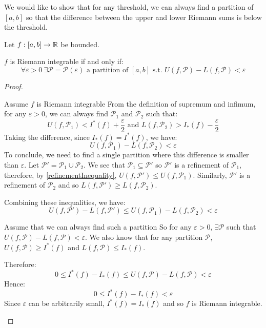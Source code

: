 \documentclass[../main.tex]{subfiles}
\begin{document}
We would like to show that for any threshold, we can always find a partition of $[a, b]$ so that the difference between the upper and lower Riemann sums is below the threshold.
\begin{proposition}
  Let $f: [a, b] \to \mathbb{R}$ be bounded.

  $f$ is Riemann integrable if and only if:
  \label{integrabilityCritereon}
  \[
    \forall \varepsilon > 0\ \exists \mathcal{P} = \mathcal{P}(\varepsilon) \text{ a partition of } [a, b] \text{ s.t. } U(f, \mathcal{P}) - L(f, \mathcal{P}) < \varepsilon
  \]
\end{proposition}
\begin{proof}
  \begin{proofdirection}{Assume $f$ is Riemann integrable}
    From the definition of supremum and infimum, for any $\varepsilon > 0$, we can always find $\mathcal{P}_1$ and $\mathcal{P}_2$ such that:
    \[
      U(f, \mathcal{P}_1) < I^{*}(f) + \frac{\varepsilon}{2} \text{ and } L(f, \mathcal{P}_2) > I_{*}(f) - \frac{\varepsilon}{2}
    \]
    Taking the difference, since $I_{*}(f) = I^{*}(f)$, we have:
    \[
      U(f, \mathcal{P}_1) - L(f, \mathcal{P}_2) < \varepsilon
    \]
    To conclude, we need to find a single partition where this difference is smaller than $\varepsilon$.
    Let $\mathcal{P}' = \mathcal{P}_1 \cup \mathcal{P}_2$.
    We see that $\mathcal{P}_1 \subseteq \mathcal{P}'$ so $\mathcal{P}'$ is a refinement of $\mathcal{P}_1$, therefore, by \cref{refinementInequality}, $U(f, \mathcal{P}') \leq U(f, \mathcal{P}_1)$.
    Similarly, $\mathcal{P}'$ is a refinement of $\mathcal{P}_2$ and so $L(f, \mathcal{P}') \geq L(f, \mathcal{P}_2)$.

    Combining these inequalities, we have:
    \[
      U(f, \mathcal{P}') - L(f, \mathcal{P}') \leq U(f, \mathcal{P}_1) - L(f, \mathcal{P}_2) < \varepsilon
    \]
  \end{proofdirection}
  \begin{proofdirection}{Assume that we can always find such a partition}
    So for any $\varepsilon > 0$, $\exists \mathcal{P}$ such that $U(f, \mathcal{P}) - L(f, \mathcal{P}) < \varepsilon$.
    We also know that for any partition $\mathcal{P}$, $U(f, \mathcal{P}) \geq I^{*}(f)$ and $L(f, \mathcal{P}) \leq I_*(f)$.

    Therefore:
    \[
      0 \leq I^{*}(f) - I_{*}(f) \leq U(f, \mathcal{P}) - L(f, \mathcal{P}) < \varepsilon
    \]
    Hence:
    \[
      0 \leq I^{*}(f) - I_{*}(f) < \varepsilon
    \]
    Since $\varepsilon$ can be arbitrarily small, $I^{*}(f) = I_{*}(f)$ and so $f$ is Riemann integrable.
  \end{proofdirection}
\end{proof}
\end{document}
